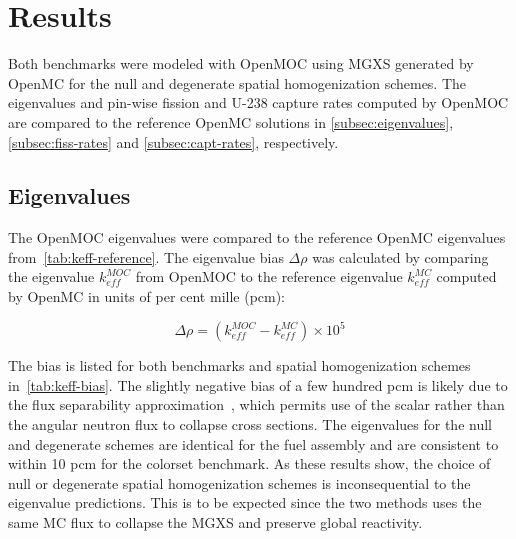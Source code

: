 \section{Results}
\label{sec:results}

Both benchmarks were modeled with OpenMOC using MGXS generated by OpenMC for the null and degenerate spatial homogenization schemes. The eigenvalues and pin-wise fission and U-238 capture rates computed by OpenMOC are compared to the reference OpenMC solutions in \autoref{subsec:eigenvalues}, \autoref{subsec:fiss-rates} and \autoref{subsec:capt-rates}, respectively.


\subsection{Eigenvalues}
\label{subsec:eigenvalues}

The OpenMOC eigenvalues were compared to the reference OpenMC eigenvalues from~\autoref{tab:keff-reference}. The eigenvalue bias $\Delta\rho$ was calculated by comparing the eigenvalue $k_{eff}^{MOC}$ from OpenMOC to the reference eigenvalue $k_{eff}^{MC}$ computed by OpenMC in units of per cent mille (pcm):

\begin{equation}
\label{eqn:delta-rho}
\Delta\rho = \left(k_{eff}^{MOC} - k_{eff}^{MC}\right) \times 10^{5}
\end{equation}

The bias is listed for both benchmarks and spatial homogenization schemes in~\autoref{tab:keff-bias}. The slightly negative bias of a few hundred pcm is likely due to the flux separability approximation~\citep{boyd2017sph}, which permits use of the scalar rather than the angular neutron flux to collapse cross sections. The eigenvalues for the null and degenerate schemes are identical for the fuel assembly and are consistent to within 10 pcm for the colorset benchmark. As these results show, the choice of null or degenerate spatial homogenization schemes is inconsequential to the eigenvalue predictions. This is to be expected since the two methods uses the same MC flux to collapse the MGXS and preserve global reactivity.


